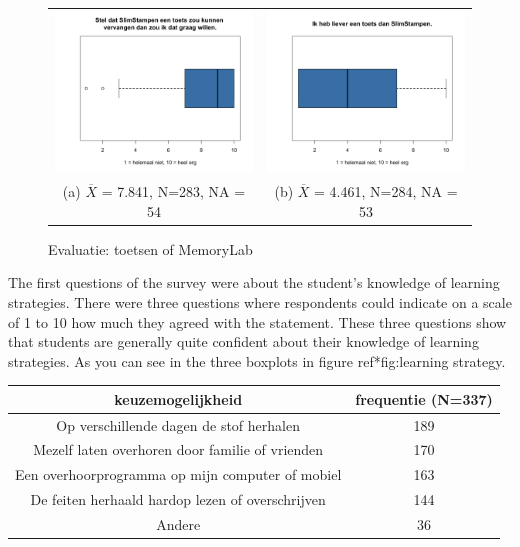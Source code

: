 \documentclass[12pt, a4paper]{article}
\begin{document}
{{    \begin{figure}
        \begin{tabular}{cc}
          \includegraphics[width=65mm]{25-ToetsVervangen.png} &   \includegraphics[width=65mm]{26-LieverToets.png} \\
        (a)  $\overline{X}$ = 7.841, N=283, NA = 54 & (b) $\overline{X}$ =  4.461, N=284, NA = 53 \\[6pt]
        \end{tabular}
        \caption{Evaluatie: toetsen of MemoryLab}
        \label{fig:evaluatie}
        \end{figure}

The first questions of the survey were about the student's knowledge of learning strategies. There were three questions where respondents could indicate on a scale of 1 to 10 how much they agreed with the statement. These three questions show that students are generally quite confident about their knowledge of learning strategies. As you can see in the three boxplots in figure ref*{fig:learning strategy}.

\begin{center}
    \begin{tabular}{|c|c|} 
    \hline
         keuzemogelijkheid & frequentie (N=337) \\
     \hline
     Op verschillende dagen de stof herhalen & 189 \\ 
     Mezelf laten overhoren door familie of vrienden & 170  \\ 
     Een overhoorprogramma op mijn computer of mobiel & 163 \\
     De feiten herhaald hardop lezen of overschrijven & 144  \\ 
     Andere & 36 \\
     \hline
    \end{tabular}
    \end{center}

}}
\end{document}

